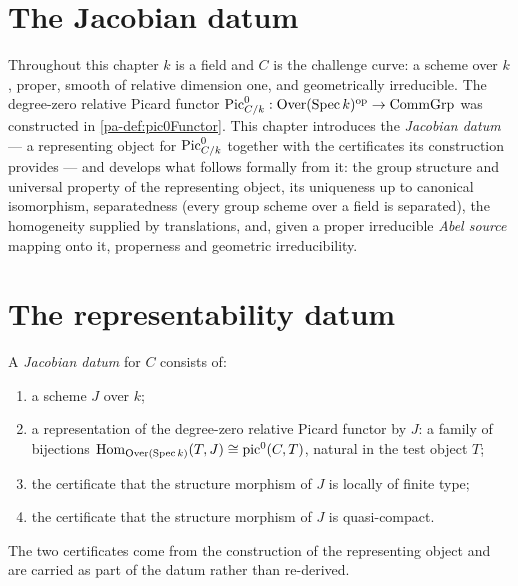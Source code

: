 \section{The Jacobian datum}
\label{pa-chap:Jacobian}

Throughout this chapter \(k\) is a field and \(C\) is the challenge curve: a
scheme over \(k\), proper, smooth of relative dimension one, and geometrically
irreducible. The degree-zero relative Picard functor
\(\operatorname{Pic}^0_{C/k} : \mathrm{Over}(\operatorname{Spec} k)^{\mathrm{op}} \to \mathrm{CommGrp}\) was constructed in
\ref{pa-def:pic0Functor}. This chapter introduces the \emph{Jacobian datum} --- a
representing object for \(\operatorname{Pic}^0_{C/k}\) together with the certificates its
construction provides --- and develops what follows formally from it: the
group structure and universal property of the representing object, its
uniqueness up to canonical isomorphism, separatedness (every group scheme over
a field is separated), the homogeneity supplied by translations, and, given a
proper irreducible \emph{Abel source} mapping onto it, properness and geometric
irreducibility.

\section{The representability datum}
\label{pa-sec:jacobian_datum}

\begin{definition}
  \label{pa-def:jacobian_data}
  \leanok

  A \emph{Jacobian datum} for \(C\) consists of:
  \begin{enumerate}
    \item a scheme \(J\) over \(k\);
    \item a representation of the degree-zero relative Picard functor by
      \(J\): a family of bijections
      \(\operatorname{Hom}_{\mathrm{Over}(\operatorname{Spec} k)}(T, J) \cong \mathrm{pic}^0(C, T)\), natural in
      the test object \(T\);
    \item the certificate that the structure morphism of \(J\) is locally of
      finite type;
    \item the certificate that the structure morphism of \(J\) is
      quasi-compact.
  \end{enumerate}
  The two certificates come from the construction of the representing object
  and are carried as part of the datum rather than re-derived.
\end{definition}

